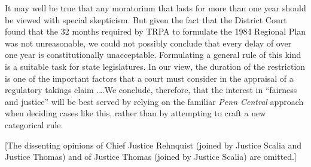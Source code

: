 It may well be true that any moratorium that lasts for more than one year should
be viewed with special skepticism. But given the fact that the District Court
found that the 32 months required by TRPA to formulate the 1984 Regional Plan
was not unreasonable, we could not possibly conclude that every delay of over
one year is constitutionally unacceptable. Formulating a general rule of this
kind is a suitable task for state legislatures. In our view, the duration of the
restriction is one of the important factors that a court must consider in the
appraisal of a regulatory takings claim .\ldots We conclude, therefore, that the
interest in ``fairness and justice'' will be best served by relying on the
familiar \textit{Penn Central} approach when deciding cases like this, rather
than by attempting to craft a new categorical rule.

[The dissenting opinions of Chief Justice Rehnquist (joined by Justice Scalia
and Justice Thomas) and of Justice Thomas (joined by Justice Scalia) are
omitted.]

